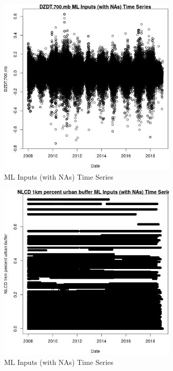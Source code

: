\begin{figure} 
\centering  
\includegraphics[width=0.77\textwidth]{Code_Outputs/Report_ML_input_PM25_Step4_part_e_de_duplicated_aves_compiled_2019-05-21wNAs_DZDT700mbvDate.jpg} 
\caption{\label{fig:Report_ML_input_PM25_Step4_part_e_de_duplicated_aves_compiled_2019-05-21wNAsDZDT700mbvDate}ML Inputs (with NAs) Time Series} 
\end{figure} 
 

\begin{figure} 
\centering  
\includegraphics[width=0.77\textwidth]{Code_Outputs/Report_ML_input_PM25_Step4_part_e_de_duplicated_aves_compiled_2019-05-21wNAs_NLCD_1km_percent_urban_buffervDate.jpg} 
\caption{\label{fig:Report_ML_input_PM25_Step4_part_e_de_duplicated_aves_compiled_2019-05-21wNAsNLCD_1km_percent_urban_buffervDate}ML Inputs (with NAs) Time Series} 
\end{figure} 
 

